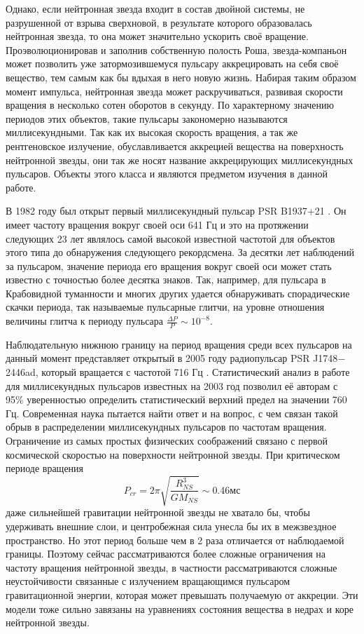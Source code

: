 \documentclass[14pt,a4paper]{extarticle}
\newcommand{\be}{\begin{equation}}
\newcommand{\ee}{\end{equation}}
\begin{document}
			Однако, если нейтронная звезда входит в состав двойной системы, не разрушенной от взрыва сверхновой, в результате которого образовалась нейтронная звезда, то она может значительно ускорить своё вращение. 
			Проэволюционировав и заполнив собственную полость Роша, звезда-компаньон может позволить уже затормозившемуся пульсару аккрецировать на себя своё вещество, тем самым как бы вдыхая в него новую жизнь. 
			Набирая таким образом момент импульса, нейтронная звезда может раскручиваться, развивая скорости вращения в несколько сотен оборотов в секунду.
			По характерному значению периодов этих объектов, такие пульсары закономерно называются миллисекундными.
			Так как их высокая скорость вращения, а так же рентгеновское излучение, обуславливается аккрецией вещества на поверхность нейтронной звезды, они так же носят название аккрецирующих миллисекундных пульсаров.
			Объекты этого класса и являются предметом изучения в данной работе.   
			
			В 1982 году был открыт первый миллисекундный пульсар PSR B1937+21 \cite{Backer1982}.
			Он имеет частоту вращения вокруг своей оси 641 Гц и это на протяжении следующих 23 лет являлось самой высокой известной частотой для объектов этого типа до обнаружения следующего рекордсмена.			
			За десятки лет наблюдений за пульсаром, значение периода его вращения вокруг своей оси может стать известно с точностью более десятка знаков.
			Так, например, для пульсара в Крабовидной туманности и многих других удается \cite{Martin-Carrillo2012} обнаруживать спорадические скачки периода, так называемые пульсарные глитчи, на уровне отношения величины глитча к периоду пульсара $\frac{\Delta P}P \sim 10^{-8}$. 

			Наблюдательную нижнюю границу на период вращения среди всех пульсаров на данный момент представляет открытый в 2005 году 
			радиопульсар PSR J1748$-$2446ad, который вращается с частотой 716 Гц \cite{Hessels2006}. 
			Статистический анализ в работе \cite{Chakrabarty2003} для миллисекундных пульсаров известных на 2003 год позволил её авторам с 95\% уверенностью определить статистический верхний предел на значении 760 Гц.
			Современная наука пытается найти ответ и на вопрос, с чем связан такой обрыв в распределении миллисекундных пульсаров по частотам вращения.
			Ограничение из самых простых физических соображений связано с первой космической скоростью на поверхности нейтронной звезды. 
			При критическом периоде вращения
			\be
			P_{cr}=2\pi\sqrt{\frac{R_{NS}^3}{GM_{NS}}} \sim 0.46 \text{мс} \ee
			даже сильнейшей гравитации нейтронной звезды не хватало бы, чтобы удерживать внешние слои, и центробежная сила унесла бы их в межзвездное пространство.
			Но этот период больше чем в 2 раза отличается от наблюдаемой границы. 
			Поэтому сейчас рассматриваются \cite{Cuofano2012} более сложные ограничения на частоту вращения нейтронной звезды, в частности рассматриваются сложные неустойчивости связанные с излучением вращающимся пульсаром гравитационной энергии, которая может превышать получаемую от аккреции.
			Эти модели тоже сильно завязаны на уравнениях состояния вещества в недрах и коре нейтронной звезды. 
\end{document}
